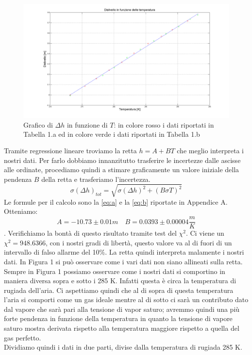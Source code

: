 \begin{figure}[H]
\centering
\includegraphics[width=\textwidth]{img/1}
\caption{Grafico di $\Delta h$ in funzione di $T$: in colore rosso i dati riportati in Tabella 1.a ed in colore verde i dati riportati in Tabella 1.b }
\end{figure}

Tramite regressione lineare troviamo la retta $h = A+BT$ che meglio interpreta i nostri dati. 
Per farlo dobbiamo innanzitutto trasferire le incertezze dalle ascisse alle ordinate, procediamo quindi a stimare graficamente un valore iniziale della pendenza $B$ della retta e trasferiamo l'incertezza.
\begin{equation}
\label{eq:propagazione}
\sigma(\Delta h)_{tot} = \sqrt{\sigma(\Delta h)^2 + (B\sigma T)^2}
\end{equation}
Le formule per il calcolo sono la \eqref{eq:a} e la \eqref{eq:b} riportate in Appendice A. 
Otteniamo:
\[A = -10.73 \pm 0.01 m \quad  B = 0.0393 \pm  0.00004 \frac{m}{K} \] .
Verifichiamo la bontà di questo risultato tramite test del $\chi^2$. 
Ci viene un $\chi^2 = 948.6366$, con i nostri gradi di libertà, questo valore va al di fuori di un intervallo di falso allarme del 10\%.
La retta quindi interpreta malamente i nostri dati. 
In Figura 1 si può osservare come i vari dati non siano allineati sulla retta. 
Sempre in Figura 1 possiamo osservare come i nostri dati si comportino in maniera diversa sopra e sotto i 285 K. 
Infatti questa è circa la temperatura di rugiada dell'aria. 
Ci aspettiamo quindi che al di sopra di questa temperatura l'aria si comporti come un gas ideale mentre al di sotto ci sarà un contributo dato dal vapore che sarà pari alla tensione di vapor saturo; avremmo quindi una più forte pendenza in funzione della temperatura in quanto la tensione di vapore saturo mostra derivata rispetto alla temperatura maggiore rispetto a quella del gas perfetto.\\
\newline
Dividiamo quindi i dati in due parti, divise dalla temperatura di rugiada 285 K.

